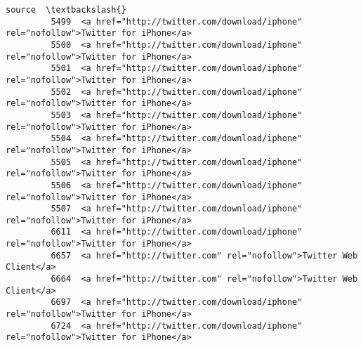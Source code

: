 \documentclass[11pt]{article}
\begin{document}
\begin{Verbatim}[commandchars=\\\{\}]
                                                                                           source  \textbackslash{}
         5499  <a href="http://twitter.com/download/iphone" rel="nofollow">Twitter for iPhone</a>   
         5500  <a href="http://twitter.com/download/iphone" rel="nofollow">Twitter for iPhone</a>   
         5501  <a href="http://twitter.com/download/iphone" rel="nofollow">Twitter for iPhone</a>   
         5502  <a href="http://twitter.com/download/iphone" rel="nofollow">Twitter for iPhone</a>   
         5503  <a href="http://twitter.com/download/iphone" rel="nofollow">Twitter for iPhone</a>   
         5504  <a href="http://twitter.com/download/iphone" rel="nofollow">Twitter for iPhone</a>   
         5505  <a href="http://twitter.com/download/iphone" rel="nofollow">Twitter for iPhone</a>   
         5506  <a href="http://twitter.com/download/iphone" rel="nofollow">Twitter for iPhone</a>   
         5507  <a href="http://twitter.com/download/iphone" rel="nofollow">Twitter for iPhone</a>   
         6611  <a href="http://twitter.com/download/iphone" rel="nofollow">Twitter for iPhone</a>   
         6657  <a href="http://twitter.com" rel="nofollow">Twitter Web Client</a>                   
         6664  <a href="http://twitter.com" rel="nofollow">Twitter Web Client</a>                   
         6697  <a href="http://twitter.com/download/iphone" rel="nofollow">Twitter for iPhone</a>   
         6724  <a href="http://twitter.com/download/iphone" rel="nofollow">Twitter for iPhone</a>   
         

\end{Verbatim}
\end{document}
